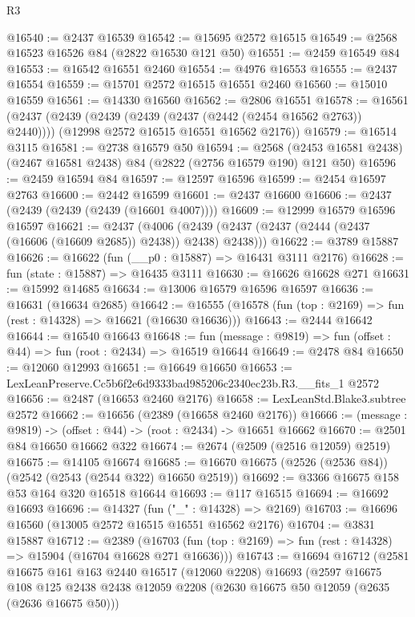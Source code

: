 \begin{lexlean}{R3}
\begin{coremodule}
@16540 := @2437 @16539
@16542 := @15695 @2572 @16515
@16549 := @2568 @16523 @16526 @84 (@2822 @16530 @121 @50)
@16551 := @2459 @16549 @84
@16553 := @16542 @16551 @2460
@16554 := @4976 @16553
@16555 := @2437 @16554
@16559 := @15701 @2572 @16515 @16551 @2460
@16560 := @15010 @16559
@16561 := @14330 @16560
@16562 := @2806 @16551
@16578 := @16561
    (@2437
      (@2439 (@2439 (@2439 (@2437 (@2442 (@2454 @16562 @2763)) @2440))))
      (@12998 @2572 @16515 @16551 @16562 @2176))
@16579 := @16514 @3115
@16581 := @2738 @16579 @50
@16594 := @2568 (@2453 @16581 @2438) (@2467 @16581 @2438) @84 (@2822 (@2756 @16579 @190) @121 @50)
@16596 := @2459 @16594 @84
@16597 := @12597 @16596
@16599 := @2454 @16597 @2763
@16600 := @2442 @16599
@16601 := @2437 @16600
@16606 := @2437 (@2439 (@2439 (@2439 (@16601 @4007))))
@16609 := @12999 @16579 @16596 @16597
@16621 := @2437
    (@4006 (@2439 (@2437 (@2437 (@2444 (@2437 (@16606 (@16609 @2685)) @2438)) @2438) @2438)))
@16622 := @3789 @15887
@16626 := @16622 (fun (__p0 : @15887) => @16431 @3111 @2176)
@16628 := fun (state : @15887) => @16435 @3111
@16630 := @16626 @16628 @271
@16631 := @15992 @14685
@16634 := @13006 @16579 @16596 @16597
@16636 := @16631 (@16634 @2685)
@16642 := @16555 (@16578 (fun (top : @2169) => fun (rest : @14328) => @16621 (@16630 @16636)))
@16643 := @2444 @16642
@16644 := @16540 @16643
@16648 := fun (message : @9819) => fun (offset : @44) => fun (root : @2434) => @16519 @16644
@16649 := @2478 @84
@16650 := @12060 @12993
@16651 := @16649 @16650
@16653 := LexLeanPreserve.Cc5b6f2e6d9333bad985206c2340ec23b.R3.__fits_1 @2572
@16656 := @2487 (@16653 @2460 @2176)
@16658 := LexLeanStd.Blake3.subtree @2572
@16662 := @16656 (@2389 (@16658 @2460 @2176))
@16666 := (message : @9819) -> (offset : @44) -> (root : @2434) -> @16651 @16662
@16670 := @2501 @84 @16650 @16662 @322
@16674 := @2674 (@2509 (@2516 @12059) @2519)
@16675 := @14105 @16674
@16685 := @16670 @16675 (@2526 (@2536 @84)) (@2542 (@2543 (@2544 @322) @16650 @2519))
@16692 := @3366 @16675 @158 @53 @164 @320 @16518 @16644
@16693 := @117 @16515
@16694 := @16692 @16693
@16696 := @14327 (fun ("_" : @14328) => @2169)
@16703 := @16696 @16560 (@13005 @2572 @16515 @16551 @16562 @2176)
@16704 := @3831 @15887
@16712 := @2389
    (@16703 (fun (top : @2169) => fun (rest : @14328) => @15904 (@16704 @16628 @271 @16636)))
@16743 := @16694
    @16712
    (@2581
      @16675
      @161
      @163
      @2440
      @16517
      (@12060 @2208)
      @16693
      (@2597
        @16675
        @108
        @125
        @2438
        @2438
        @12059
        @2208
        (@2630 @16675 @50 @12059 (@2635 (@2636 @16675 @50)))

\end{coremodule}
\end{lexlean}
